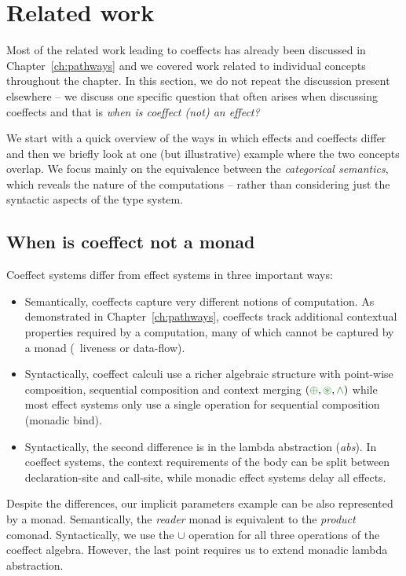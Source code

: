 \section{Related work}
\label{sec:flat-related}

Most of the related work leading to coeffects has already been discussed in Chapter~\ref{ch:pathways} 
and we covered work related to individual concepts throughout the chapter. In this section, we
do not repeat the discussion present elsewhere -- we discuss one specific question that often 
arises when discussing coeffects and that is \emph{when is coeffect (not) an effect?}

We start with a quick overview of the ways in which effects and coeffects differ and then
we briefly look at one (but illustrative) example where the two concepts overlap. We focus 
mainly on the equivalence between the \emph{categorical semantics}, which reveals the nature
of the computations -- rather than considering just the syntactic aspects of the type system.

\subsection{When is coeffect not a monad}
Coeffect systems differ from effect systems in three important ways:

\begin{itemize}
\item Semantically, coeffects capture very different notions of computation. As demonstrated in 
  Chapter~\ref{ch:pathways}, coeffects track additional contextual properties required by a
  computation, many of which cannot be captured by a monad (\eg~liveness or data-flow).

\item Syntactically, coeffect calculi use a richer algebraic structure with point-wise composition,
  sequential composition and context merging $(\cpar, \cseq, \czip)$ while most effect systems
  only use a single operation for sequential composition (monadic bind).

\item Syntactically, the second difference is in the lambda abstraction (\emph{abs}). In 
  coeffect systems, the context requirements of the body can be split between declaration-site
  and call-site, while monadic effect systems delay all effects.
\end{itemize}

\noindent
Despite the differences, our implicit parameters example can be also represented by a monad.
Semantically, the \emph{reader} monad is equivalent to the \emph{product} comonad. Syntactically,
we use the $\cup$ operation for all three operations of the coeffect algebra. However, the last
point requires us to extend monadic lambda abstraction.

